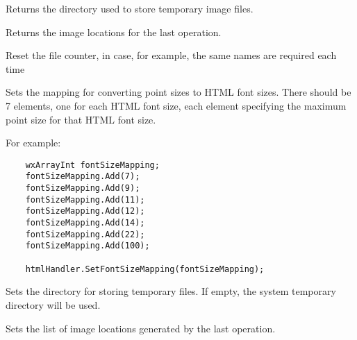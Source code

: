 \label{wxrichtexthtmlhandlergettempdir}


Returns the directory used to store temporary image files.

\label{wxrichtexthtmlhandlergettemporaryimagelocations}


Returns the image locations for the last operation.

\label{wxrichtexthtmlhandlersetfilecounter}


Reset the file counter, in case, for example, the same names are required each time

\label{wxrichtexthtmlhandlersetfontsizemapping}


Sets the mapping for converting point sizes to HTML font sizes.
There should be 7 elements, one for each HTML font size, each element specifying the maximum point size for that
HTML font size.

For example:

\begin{verbatim}
    wxArrayInt fontSizeMapping;
    fontSizeMapping.Add(7);
    fontSizeMapping.Add(9);
    fontSizeMapping.Add(11);
    fontSizeMapping.Add(12);
    fontSizeMapping.Add(14);
    fontSizeMapping.Add(22);
    fontSizeMapping.Add(100);
    
    htmlHandler.SetFontSizeMapping(fontSizeMapping);
\end{verbatim}

\label{wxrichtexthtmlhandlersettempdir}


Sets the directory for storing temporary files. If empty, the system
temporary directory will be used.

\label{wxrichtexthtmlhandlersettemporaryimagelocations}


Sets the list of image locations generated by the last operation.

